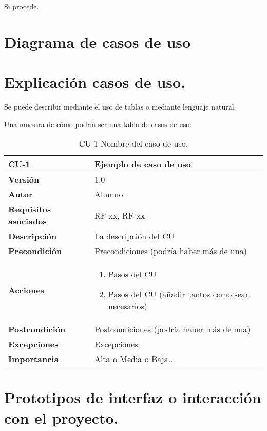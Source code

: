 
Si procede.


\section{Diagrama de casos de uso}

\section{Explicación casos de uso.}

Se puede describir mediante el uso de tablas o mediante lenguaje natural.    

Una muestra de cómo podría ser una tabla de casos de uso:

\begin{table}[p]
	\centering
	\begin{tabularx}{\linewidth}{ p{} p{} }
		\toprule
		\textbf{CU-1}    & \textbf{Ejemplo de caso de uso}\\
		\toprule
		\textbf{Versión}              & 1.0    \\
		\textbf{Autor}                & Alumno \\
		\textbf{Requisitos asociados} & RF-xx, RF-xx \\
		\textbf{Descripción}          & La descripción del CU \\
		\textbf{Precondición}         & Precondiciones (podría haber más de una) \\
		\textbf{Acciones}             &
		\begin{enumerate}
			\def\labelenumi{\arabic{enumi}.}
			\tightlist
			\item Pasos del CU
			\item Pasos del CU (añadir tantos como sean necesarios)
		\end{enumerate}\\
		\textbf{Postcondición}        & Postcondiciones (podría haber más de una) \\
		\textbf{Excepciones}          & Excepciones \\
		\textbf{Importancia}          & Alta o Media o Baja... \\
		\bottomrule
	\end{tabularx}
	\caption{CU-1 Nombre del caso de uso.}
\end{table}

\section{Prototipos de interfaz o interacción con el proyecto.}


